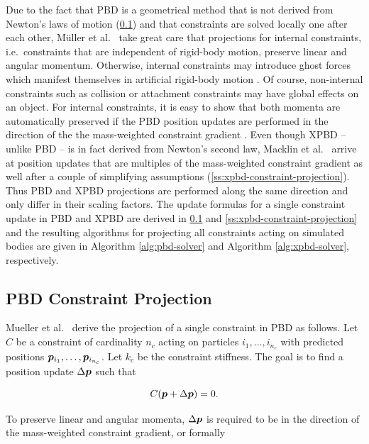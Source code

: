 Due to the fact that PBD is a geometrical method that is not derived from Newton's laws of motion (\cref{ss:pbd-constraint-projection}) and that 
constraints are solved locally one after each 
other, Müller et al.\ \cite{mueller2006} take great care that projections for internal constraints, i.e.\ constraints that are independent of rigid-body 
motion, preserve linear and angular momentum. Otherwise, internal constraints may introduce ghost forces which manifest themselves in artificial 
rigid-body motion \cite{mueller2006}. Of course, non-internal constraints such as collision or 
attachment constraints may have global effects on an object. For internal constraints, it is easy to show that both momenta are automatically preserved 
if the PBD position updates are performed in the direction of the the mass-weighted constraint gradient \cite{mueller2006}. Even though XPBD -- unlike 
PBD -- is in fact derived from Newton's second law, Macklin et al.\ \cite{macklin2016} arrive at position updates that are multiples of the mass-weighted 
constraint gradient as well after a couple of simplifying assumptions (\cref{ss:xpbd-constraint-projection}). Thus PBD and XPBD projections 
are performed along the same direction and only differ in their scaling factors. The update formulas for a single constraint update in PBD and XPBD are 
derived in \cref{ss:pbd-constraint-projection} and \cref{ss:xpbd-constraint-projection} and the resulting algorithms for projecting all constraints 
acting on simulated bodies are given in Algorithm \ref{alg:pbd-solver} and Algorithm \ref{alg:xpbd-solver}, respectively.

\subsection{PBD Constraint Projection}\label{ss:pbd-constraint-projection}

Mueller et al.\ \cite{mueller2006} derive the projection of a single constraint in PBD as follows. Let $C$ be a constraint of cardinality $n_c$ 
acting on particles $i_1, \ldots, i_{n_c}$ with predicted positions $\bm{p}_{i_1}, \ldots, \bm{p}_{i_{n_c}}$. Let $k_c$ be the constraint 
stiffness. The goal is to find a position update $\Delta \bm{p}$ such that 

\begin{equation}\label{eq:pbd-delta}
    C(\bm{p} + \Delta \bm{p}) = 0.
\end{equation}

\noindent To preserve linear and angular momenta, $\Delta \bm{p}$ is required to be in the direction of the mass-weighted constraint 
gradient, or formally

